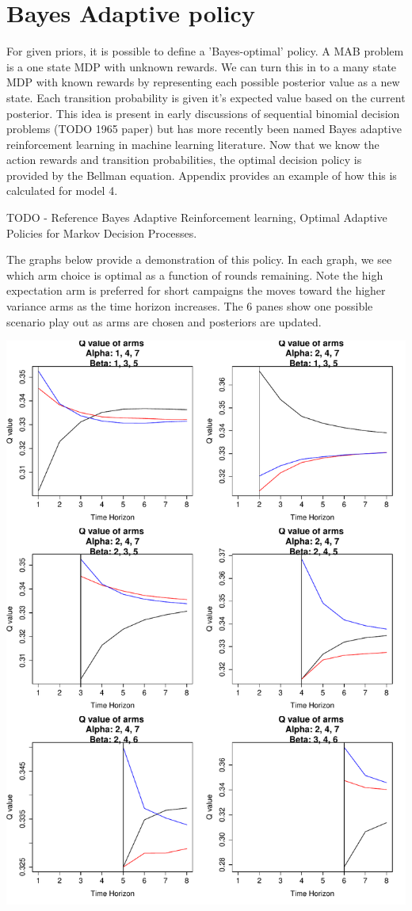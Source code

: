\documentclass[11pt,a4,singlespacing,titlepagenumber=on]{scrreprt}
\numberwithin{equation}{chapter} %
\theoremstyle{remark}
\begin{document}
\section{ Bayes Adaptive policy }

For given priors, it is possible to define a 'Bayes-optimal' policy. A MAB problem is a one state MDP with unknown rewards. We can turn this in to a many state MDP with known rewards by representing each possible posterior value as a new state. Each transition probability is given it's expected value based on the current posterior. This idea is present in early discussions of sequential binomial decision problems (TODO 1965 paper) but has more recently been named Bayes adaptive reinforcement learning in machine learning literature. Now that we know the action rewards and transition probabilities, the optimal decision policy is provided by the Bellman equation. Appendix provides an example of how this is calculated for model 4.

TODO - Reference Bayes Adaptive Reinforcement learning,
Optimal Adaptive Policies for Markov Decision Processes.

The graphs below provide a demonstration of this policy. In each graph, we see which arm choice is optimal as a function of rounds remaining. Note the high expectation arm is preferred for short campaigns the moves toward the higher variance arms as the time horizon increases. The 6 panes show one possible scenario play out as arms are chosen and posteriors are updated.

\includegraphics[scale=0.7]{BARLillustration.pdf}
\end{document}
